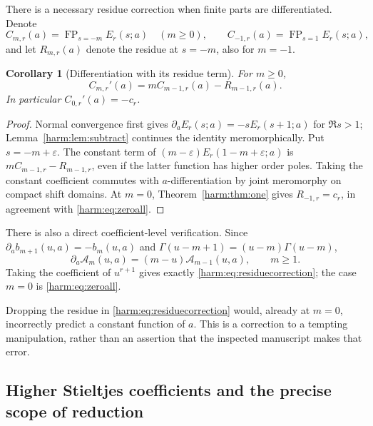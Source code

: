 \documentclass[11pt,letterpaper]{article}
\numberwithin{equation}{section}
\theoremstyle{plain}
\newtheorem{corollary}[theorem]{Corollary}
\theoremstyle{definition}
\theoremstyle{remark}
\begin{document}
There is a necessary residue correction when finite parts are
differentiated.  Denote
\[
 C_{m,r}(a)=\operatorname{FP}_{s=-m}E_r(s;a)\quad(m\geq0),
 \qquad C_{-1,r}(a)=\operatorname{FP}_{s=1}E_r(s;a),
\]
and let $R_{m,r}(a)$ denote the residue at $s=-m$, also for $m=-1$.

\begin{corollary}[Differentiation with its residue term]
\label{harm:cor:residue}
For $m\geq0$,
\begin{equation}\label{harm:eq:residuecorrection}
 C_{m,r}'(a)=mC_{m-1,r}(a)-R_{m-1,r}(a).
\end{equation}
In particular $C_{0,r}'(a)=-c_r$.
\end{corollary}
\begin{proof}
Normal convergence first gives
$\partial_a E_r(s;a)=-sE_r(s+1;a)$ for $\Re s>1$;
Lemma~\ref{harm:lem:subtract} continues the identity meromorphically.
Put $s=-m+\varepsilon$.  The constant term of
$(m-\varepsilon)E_r(1-m+\varepsilon;a)$ is
$mC_{m-1,r}-R_{m-1,r}$, even if the latter function has higher
order poles.  Taking the constant coefficient commutes with
$a$-differentiation by joint meromorphy on compact shift domains.
At $m=0$, Theorem~\ref{harm:thm:one} gives $R_{-1,r}=c_r$,
in agreement with \eqref{harm:eq:zeroall}.
\end{proof}

There is also a direct coefficient-level verification.  Since
$\partial_a b_{m+1}(u,a)=-b_m(u,a)$ and
$\Gamma(u-m+1)=(u-m)\Gamma(u-m)$,
\[
 \partial_a\mathcal A_m(u,a)=(m-u)\mathcal A_{m-1}(u,a),
 \qquad m\geq1.
\]
Taking the coefficient of $u^{r+1}$ gives exactly
\eqref{harm:eq:residuecorrection}; the case $m=0$ is
\eqref{harm:eq:zeroall}.

Dropping the residue in \eqref{harm:eq:residuecorrection} would,
already at $m=0$, incorrectly predict a constant function of $a$.
This is a correction to a tempting manipulation, rather than an
assertion that the inspected manuscript makes that error.

\subsection{Higher Stieltjes coefficients and the precise scope of reduction}
\end{document}
